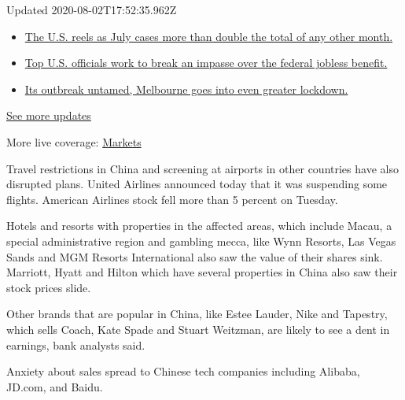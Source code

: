 Updated 2020-08-02T17:52:35.962Z

\begin{itemize}
\tightlist
\item
  \href{https://www.nytimes.com/2020/08/01/world/coronavirus-covid-19.html?action=click\&pgtype=Article\&state=default\&region=MAIN_CONTENT_1\&context=storylines_live_updates\#link-34047410}{The
  U.S. reels as July cases more than double the total of any other
  month.}
\item
  \href{https://www.nytimes.com/2020/08/01/world/coronavirus-covid-19.html?action=click\&pgtype=Article\&state=default\&region=MAIN_CONTENT_1\&context=storylines_live_updates\#link-780ec966}{Top
  U.S. officials work to break an impasse over the federal jobless
  benefit.}
\item
  \href{https://www.nytimes.com/2020/08/01/world/coronavirus-covid-19.html?action=click\&pgtype=Article\&state=default\&region=MAIN_CONTENT_1\&context=storylines_live_updates\#link-2bc8948}{Its
  outbreak untamed, Melbourne goes into even greater lockdown.}
\end{itemize}

\href{https://www.nytimes.com/2020/08/01/world/coronavirus-covid-19.html?action=click\&pgtype=Article\&state=default\&region=MAIN_CONTENT_1\&context=storylines_live_updates}{See
more updates}

More live coverage:
\href{https://www.nytimes.com/live/2020/07/31/business/stock-market-today-coronavirus?action=click\&pgtype=Article\&state=default\&region=MAIN_CONTENT_1\&context=storylines_live_updates}{Markets}

Travel restrictions in China and screening at airports in other
countries have also disrupted plans. United Airlines announced today
that it was suspending some flights. American Airlines stock fell more
than 5 percent on Tuesday.

Hotels and resorts with properties in the affected areas, which include
Macau, a special administrative region and gambling mecca, like Wynn
Resorts, Las Vegas Sands and MGM Resorts International also saw the
value of their shares sink. Marriott, Hyatt and Hilton which have
several properties in China also saw their stock prices slide.

Other brands that are popular in China, like Estee Lauder, Nike and
Tapestry, which sells Coach, Kate Spade and Stuart Weitzman, are likely
to see a dent in earnings, bank analysts said.

Anxiety about sales spread to Chinese tech companies including Alibaba,
JD.com, and Baidu.

